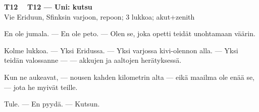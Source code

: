 \documentclass[a4paper,11pt]{article}
\begin{document}
\filbreak
\vspace{0.9mm}
\noindent
\begin{tcolorbox}[
  colframe=tothcol,
  colback=white,
  boxrule=0.8pt,
  arc=0pt,
  outer arc=0pt,
  left=2.5mm, right=2.5mm, top=2mm, bottom=2mm,
  boxsep=0.5mm,
  sharp corners,
  enhanced,
  breakable=false
]
{\large\ttfamily\bfseries T12}~~
{\normalsize\bfseries T12 --- Uni: kutsu}\\[0.2em]
{\small\color{black!65} Vie Eriduun, Sfinksin varjoon, repoon; 3 lukkoa; akut+zenith}\\[0.35em]
{\normalsize\raggedright En ole jumala. --- En ole peto. --- Olen se, joka opetti teidät unohtamaan väärin.

Kolme lukkoa. --- Yksi Eridussa. --- Yksi varjossa kivi-olennon alla. --- Yksi teidän valossanne --- --- akkujen ja aaltojen herätyksessä.

Kun ne aukeavat, --- nousen kahden kilometrin alta --- eikä maailma ole enää se, --- jota he myivät teille.

Tule. --- En pyydä. --- Kutsun.}
\end{tcolorbox}

\filbreak
\end{document}

